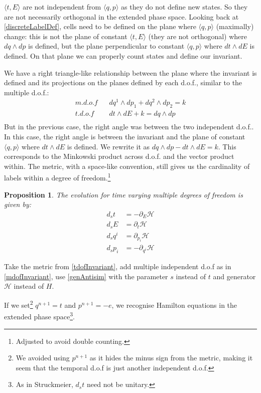 \documentclass[aps,pra,10pt,twocolumn,floatfix,nofootinbib]{revtex4-1}
\newtheorem{prop}[thm]{Proposition}
\theoremstyle{definition}
\begin{document}
$\langle t, E \rangle$ are not independent from $\langle q, p \rangle$ as they do not define new states. So they are not necessarily orthogonal in the extended phase space. Looking back at \ref{discreteLabelDef}, cells need to be defined on the plane where $\langle q, p \rangle$ (maximally) change: this is not the plane of constant $\langle t, E \rangle$ (they are not orthogonal) where $dq \wedge dp$ is defined, but the plane perpendicular to constant $\langle q, p \rangle$ where $dt \wedge dE$ is defined. On that plane we can properly count states and define our invariant.

We have a right triangle-like relationship between the plane where the invariant is defined and its projections on the planes defined by each d.o.f., similar to the multiple d.o.f.:
\begin{align*}
m.d.o.f \;\;\; &dq^1 \wedge dp_1 + dq^2 \wedge dp_2 = k \\
t.d.o.f \;\;\; &dt \wedge dE + k = dq \wedge dp \\
\end{align*}
But in the previous case, the right angle was between the two independent d.o.f.. In this case, the right angle is between the invariant and the plane of constant $\langle q, p \rangle$ where $dt \wedge dE$ is defined. We rewrite it as $dq \wedge dp - dt \wedge dE = k$. This corresponds to the Minkowski product across d.o.f. and the vector product within. The metric, with a space-like convention, still gives us the cardinality of labels within a degree of freedom.\footnote{Adjusted to avoid double counting.}

\begin{prop}\label{tdofHam}
The evolution for time varying multiple degrees of freedom is given by:
\begin{align*}
d_{s}t &= - \partial_{E} \mathcal{H} \\
d_{s}E &= \partial_{t} \mathcal{H} \\
d_{s}q^i &= \partial_{p_i} \mathcal{H} \\
d_{s}p_i &= - \partial_{q^i} \mathcal{H}
\end{align*}
\end{prop}

Take the metric from \ref{tdofInvariant}, add multiple independent d.o.f as in \ref{mdofInvariant}, use \ref{genAntisim} with the parameter $s$ instead of $t$ and generator $\mathcal{H}$ instead of $H$.

If we set\footnote{We avoided using $p^{n+1}$ as it hides the minus sign from the metric, making it seem that the temporal d.o.f is just another independent d.o.f.} $q^{n+1}=t$ and $p^{n+1}=-e$, we recognise Hamilton equations in the extended phase space\footnote{As in Struckmeier\cite{Struckmeier}, $d_{s}t$ need not be unitary.}\cite{Synge,Lanczos}.
\end{document}
